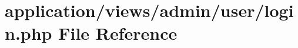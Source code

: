\hypertarget{admin_2user_2login_8php}{\section{application/views/admin/user/login.php File Reference}
\label{admin_2user_2login_8php}
}
